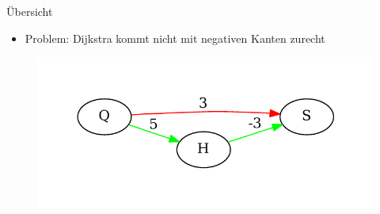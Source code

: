 \begin{frame}{Übersicht}

\begin{itemize}
\itemsep1pt\parskip0pt
\item
  Problem: Dijkstra kommt nicht mit negativen Kanten zurecht
\end{itemize}

\begin{figure}[htbp]
\centering
\includegraphics[width=\linewidth]{dijkstra_gegenbeispiel.pdf}
\end{figure}

\end{frame}

